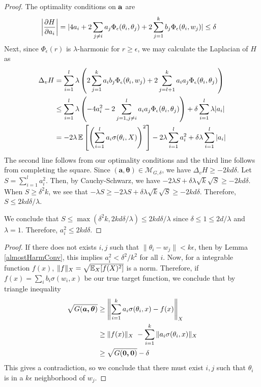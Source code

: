 \begin{proof}
The optimality conditions on ${\bf a}$ are 
\begin{align*}
   \left| \frac{\partial H}{\partial a_i} \right| & = \lvert 4a_i  + 2\sum_{j\neq i} a_j \Phi_\epsilon(\theta_i,\theta_j) + 2\sum_{j=1}^k b_j \Phi_\epsilon(\theta_i,w_j) \rvert \leq \delta
\end{align*}
%
Next, since $\Phi_\epsilon(r)$ is $\lambda$-harmonic for $r \geq \epsilon$, we may calculate the Laplacian of $H$ as
%
\begin{align*}
\Delta_v H & = \sum_{i=1}^l \lambda \left(2\sum_{j=1}^k a_ib_j
  \Phi_\epsilon(\theta_i, w_j) + 2\sum_{j=l+1}^k a_ia_j
  \Phi_\epsilon(\theta_i, \theta_j)\right) \\
& \leq \sum_{i=1}^l \lambda \left(-4 a_i^2 - 2
  \sum_{j = 1, j\neq i}^l  a_ia_j \Phi_\epsilon(\theta_i,\theta_j)\right)+ \delta \sum_{i=1}^l \lambda |a_i| \\
&= -2\lambda\operatorname*{\mathbb{E}}\left[\left( \sum_{i=1}^l a_i \sigma(\theta_i,X)\right)^2\right] -2\lambda \sum_{i=1}^l a_i^2+ \delta\lambda\sum_{i=1}^l  |a_i| 
\end{align*} 
%
The second line follows from our optimality conditions and the third line follows from completing the square. Since $\boldsymbol{(a,\theta)} \in \mathcal{M}_{G,\delta}$, we have $\Delta_v H \geq - 2kd\delta$. Let $S = \sum_{i=1}^l a_i^2$. Then, by Cauchy-Schwarz, we have $-2 \lambda S + \delta\lambda\sqrt{k} \sqrt{S} \geq -2kd\delta$. When $S \geq \delta^2 k$, we see that $-\lambda S \geq -2 \lambda S + \delta\lambda \sqrt{k}\sqrt{S} \geq -2kd\delta$. Therefore, $S \leq 2kd\delta/\lambda$.
 
We conclude that $S \leq \max(\delta^2k, 2kd\delta/\lambda) \leq 2kd\delta/\lambda$ since $\delta\leq 1 \leq 2d/\lambda$ and $\lambda = 1$. Therefore, $a_i^2 \leq 2kd\delta$.
\end{proof}

\almostharmres*

 \begin{proof}
 If there does not exists $i, j$ such that
   $\|\theta_i - w_j\| <k\epsilon$, then by Lemma \ref{almostHarmConv}, this implies $a_i^2 < \delta^2/k^2$ for all $i$. Now, for a integrable
   function $f(x)$, $\| f\|_X = \sqrt{\operatorname*{\mathbb{E}}_X[f(X)^2]}$ is a
   norm. Therefore, if $f(x) = \sum_i b_i \sigma(w_i,x)$ be our true
   target function, we conclude that by triangle inequality
\begin{align*}
\sqrt{G(\boldsymbol{a,\theta})}  & \geq \left\lVert \sum_{i=1}^k a_i \sigma(\theta_i,x) - f(x) \right\rVert_X \\
&\geq \|f(x)\|_X\ - \sum_{i=1}^k \|a_i\sigma(\theta_i,x) \|_X \\
& \geq
  \sqrt{G(\boldsymbol{0,0})} - \delta
\end{align*}
This gives a contradiction, so we conclude that there must exist $i, j$ such that $\theta_i$ is in a $k\epsilon$ neighborhood of $w_j$.
 \end{proof}
 

